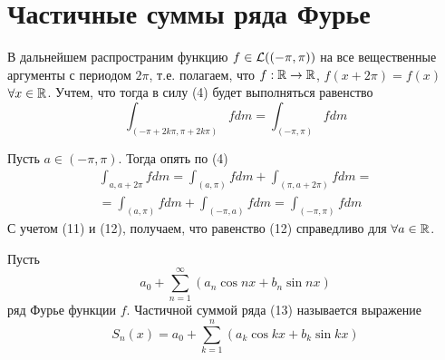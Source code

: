\documentclass[main]{subfiles}
\begin{document}
\section{Частичные суммы ряда Фурье}

В дальнейшем распространим функцию $f \in \mathcal{L}((-\pi, \pi))$ на все вещественные аргументы с периодом $2 \pi$, т.е. полагаем, что $f: \mathbb{R} \to \mathbb{R}$, $f(x + 2\pi) = f(x)$ $\forall x \in \mathbb{R}$.
Учтем, что тогда в силу (4) будет выполняться равенство
\[\int_{(-\pi + 2 k \pi, \pi + 2 k \pi)} f dm = \int_{(-\pi, \pi)} f dm \tag{11}\]

Пусть $a \in (-\pi, \pi)$.
Тогда опять по (4)
\begin{multline*}
    \int_{a, a + 2\pi} f dm = \int_{(a, \pi)} f dm + \int_{(\pi, a + 2\pi)} f dm = \\
    = \int_{(a, \pi)} f dm + \int_{(-\pi, a)} f dm = \int_{(-\pi, \pi)} f dm \tag{12}
\end{multline*}
С учетом (11) и (12), получаем, что равенство (12) справедливо для $\forall a \in \mathbb{R}$.

Пусть
\[a_0 + \sum_{n=1}^{\infty}(a_n \cos nx + b_n \sin nx) \tag{13}\]
ряд Фурье функции $f$.
Частичной суммой ряда (13) называется выражение
\[S_n(x) = a_0 + \sum_{k=1}^{n} (a_k \cos kx + b_k \sin kx) \tag{14}\]
\end{document}
